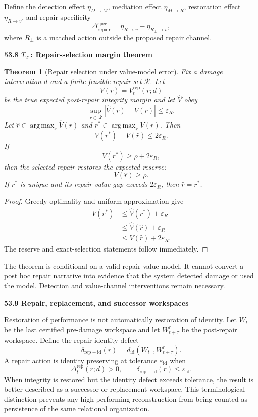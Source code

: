 \documentclass[11pt,letterpaper]{article}
\DeclareMathOperator*{\argmax}{arg\,max}
\newcommand{\subtopic}[1]{%
 \vspace{0.45em}
 {\bfseries\color{AccentColor} #1\par}
}
\theoremstyle{plain}
\newtheorem{theorem}{Theorem}
\theoremstyle{definition}
\begin{document}
Define the detection effect \(\eta_{D\to M}\), mediation effect
\(\eta_{M\to R}\), restoration effect \(\eta_{R\to v}\), and repair
specificity
\[
\Delta_{\mathrm{repair}}^{\mathrm{spec}}
=
\eta_{R\to v}
-
\eta_{R_\perp\to v},
\]
where \(R_\perp\) is a matched action outside the proposed repair channel.

\subtopic{53.8 \(T_{21}\): Repair-selection margin theorem }

\begin{theorem}[Repair selection under value-model error]
\label{thm:repair-selection}
Fix a damage intervention \(d\) and a finite feasible repair set
\(\mathcal R\). Let
\[
V(r)=V_t^{\mathrm{rep}}(r;d)
\]
be the true expected post-repair integrity margin and let \(\widehat V\) obey
\[
\sup_{r\in\mathcal R}|\widehat V(r)-V(r)|
\leq
\varepsilon_R.
\]
Let \(\widehat r\in\argmax_r\widehat V(r)\) and
\(r^*\in\argmax_r V(r)\). Then
\[
\boxed{
V(r^*)-V(\widehat r)
\leq
2\varepsilon_R.
}
\]
If
\[
V(r^*)
\geq
\rho+2\varepsilon_R,
\]
then the selected repair restores the expected reserve:
\[
\boxed{V(\widehat r)\geq\rho.}
\]
If \(r^*\) is unique and its repair-value gap exceeds
\(2\varepsilon_R\), then \(\widehat r=r^*\).
\end{theorem}

\begin{proof}
Greedy optimality and uniform approximation give
\[
\begin{aligned}
V(r^*)
&\leq
\widehat V(r^*)+\varepsilon_R\\
&\leq
\widehat V(\widehat r)+\varepsilon_R\\
&\leq
V(\widehat r)+2\varepsilon_R.
\end{aligned}
\]
The reserve and exact-selection statements follow immediately.
\end{proof}

The theorem is conditional on a valid repair-value model. It cannot convert a
post hoc repair narrative into evidence that the system detected damage or
used the model. Detection and value-channel interventions remain necessary.

\subtopic{53.9 Repair, replacement, and successor workspaces}

Restoration of performance is not automatically restoration of identity. Let
\(W_{t^-}\) be the last certified pre-damage workspace and let
\(W_{t+\tau}^{r}\) be the post-repair workspace. Define the repair identity
defect
\[
\delta_{\mathrm{rep-id}}(r)
=
 d_{\mathrm{id}}
\left(
W_{t^-},W_{t+\tau}^{r}
\right).
\]
A repair action is identity preserving at tolerance
\(\varepsilon_{\mathrm{id}}\) when
\[
\Delta_t^{\mathrm{rep}}(r;d)>0,
\qquad
\delta_{\mathrm{rep-id}}(r)
\leq
\varepsilon_{\mathrm{id}}.
\]
When integrity is restored but the identity defect exceeds tolerance, the
result is better described as a successor or replacement workspace. This
terminological distinction prevents any high-performing reconstruction from
being counted as persistence of the same relational organization.
\end{document}
